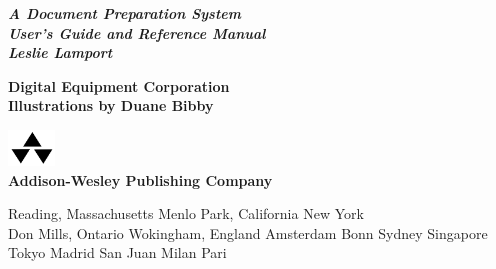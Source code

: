 \thispagestyle{plain}
\begin{titlepage}
  \centering
  \scalebox{11}{\LaTeX}

  \vspace*{4em}
  {\huge\sffamily\itshape\bfseries 
  A Document Preparation System\\[.5em] 
  User's Guide and Reference Manual\\[2em]
  Leslie Lamport}

  \bigskip 
  {\Large\bfseries\sffamily 
  Digital Equipment Corporation\\[4em]
  Illustrations by Duane Bibby}

  \vfill 
  \includegraphics[width=1.25cm]{./figure/addison-wesley-logo.png}\\[.5em]
  {\Large\bfseries Addison-Wesley Publishing Company}\\
  \bigskip
  \parbox{14cm}{\Large\sffamily\centering Reading, Massachusetts Menlo Park, California New York\\
  Don Mills, Ontario Wokingham, England Amsterdam Bonn Sydney
  Singapore Tokyo Madrid San Juan Milan Pari}
\end{titlepage}




